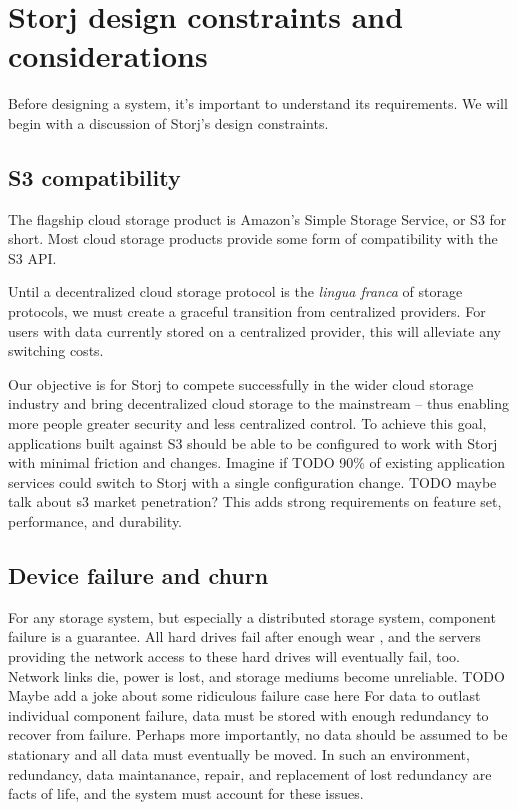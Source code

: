\documentclass[a4paper,10pt]{article} \usepackage[utf8]{inputenc}
\newcommand{\todo}[1]{{\color{red} TODO #1 }}
\begin{document}
\section{Storj design constraints and
considerations}\label{sec:design_constraints}

Before designing a system, it's important to understand its requirements.
We will begin with a discussion of Storj's design constraints.

\subsection{S3 compatibility}

The flagship cloud storage product is Amazon's Simple Storage Service, or S3 for
short. Most cloud storage products provide some form of compatibility with the
S3 API.

Until a decentralized cloud storage protocol is the {\em lingua franca} of
storage protocols, we must create a graceful transition from centralized providers.
For users with data currently stored on a centralized provider, this will alleviate
any switching costs.

Our objective is for Storj to compete successfully in the wider cloud storage
industry and bring decentralized cloud storage to the mainstream -- thus enabling
more people greater security and less centralized control. To achieve this goal,
applications built against S3 should be able to be configured to work with Storj with
minimal friction and changes.
Imagine if \todo{90\%} of existing application services could switch to Storj with a
single configuration change. \todo{maybe talk about s3 market penetration?}
This adds strong requirements on feature set,
performance, and durability.

\subsection{Device failure and churn}

For any storage system, but especially a distributed storage system, component
failure is a guarantee. All hard drives fail after enough wear
\cite{backblaze-hd-2018-q1}, and the servers providing the network access to
these hard drives will eventually fail, too. Network links die, power is lost,
and storage mediums become unreliable. \todo{Maybe add a joke about some ridiculous failure case here}  For data to outlast individual component
failure, data must be stored with enough redundancy to recover from failure.
Perhaps more importantly, no data should be assumed to be stationary and all
data must eventually be moved. In such an environment, redundancy, data
maintanance, repair, and replacement of lost redundancy are facts of life, and
the system must account for these issues.
\end{document}

